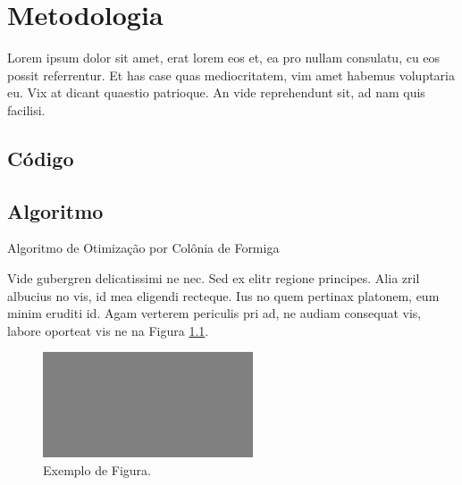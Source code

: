 \chapter{Metodologia}
\label{chap:metodologia}

	Lorem ipsum dolor sit amet, erat lorem eos et, ea pro nullam consulatu, cu eos possit referrentur. Et has case quas mediocritatem, vim amet habemus voluptaria eu. Vix at dicant quaestio patrioque. An vide reprehendunt sit, ad nam quis facilisi.

	\section{Código}

		

	\section{Algoritmo}

		\begin{algorithm}[H]
			\SetSpacedAlgorithm
			\caption{\label{alg:algoritmo_de_colonica_de_formigas}Algoritmo de Otimização por Colônia de Formiga}
		\end{algorithm}

	Vide gubergren delicatissimi ne nec. Sed ex elitr regione principes. Alia zril albucius no vis, id mea eligendi recteque. Ius no quem pertinax platonem, eum minim eruditi id. Agam verterem periculis pri ad, ne audiam consequat vis, labore oporteat vis ne na Figura \ref{fig:metodologia}.

	\begin{figure}[ht]
		\centering
		\includegraphics[width=0.555\textwidth]{figuras/fig2.png}
		\setlength{\abovecaptionskip}{10pt}
		\caption{Exemplo de Figura.}
		\label{fig:metodologia}
	\end{figure}

